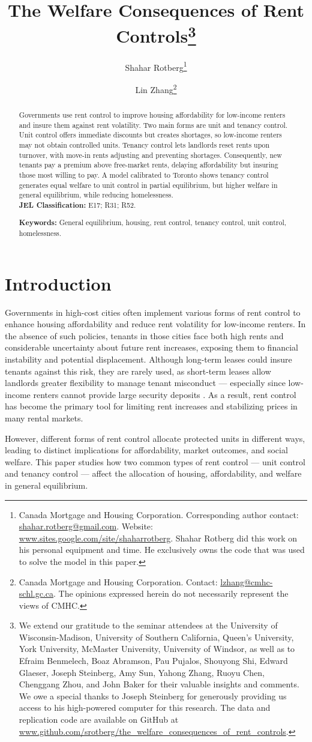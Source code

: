 \documentclass[parskip=full]{article}
\title{\vspace{-1.8cm}The Welfare Consequences of Rent Controls\footnote{We extend our gratitude to the seminar attendees at the University of Wisconsin-Madison, University of Southern California, Queen's University, York University, McMaster University, University of Windsor, as well as to Efraim Benmelech, Boaz Abramson, Pau Pujalos, Shouyong Shi, Edward Glaeser, Joseph Steinberg, Amy Sun, Yahong Zhang, Ruoyu Chen, Chenggang Zhou, and John Baker for their valuable insights and comments. We owe a special thanks to Joseph Steinberg for generously providing us access to his high-powered computer for this research. The data and replication code are available on GitHub at \url{www.github.com/srotberg/the_welfare_consequences_of_rent_controls}.}}
\author{Shahar Rotberg\footnote{Canada Mortgage and Housing Corporation. Corresponding author contact: \url{shahar.rotberg@gmail.com}. Website: \url{www.sites.google.com/site/shaharrotberg}. Shahar Rotberg did this work on his personal equipment and time. He exclusively owns the code that was used to solve the model in this paper.} \and Lin Zhang\footnote{Canada Mortgage and Housing Corporation. Contact: \url{lzhang@cmhc-schl.gc.ca}. The opinions expressed herein do not necessarily represent the views of CMHC.}}
\begin{document}
\maketitle

\begin{abstract}
\onehalfspacing
\noindent Governments use rent control to improve housing affordability for low-income renters and insure them against rent volatility. Two main forms are unit and tenancy control. Unit control offers immediate discounts but creates shortages, so low-income renters may not obtain controlled units. Tenancy control lets landlords reset rents upon turnover, with move-in rents adjusting and preventing shortages. Consequently, new tenants pay a premium above free-market rents, delaying affordability but insuring those most willing to pay. A model calibrated to Toronto shows tenancy control generates equal welfare to unit control in partial equilibrium, but higher welfare in general equilibrium, while reducing homelessness. 
\\[1.5ex]

\noindent \textbf{JEL Classification:} E17; R31; R52. 

\noindent \textbf{Keywords:} General equilibrium, housing, rent control, tenancy control, unit control, homelessness.
\end{abstract}

\section{Introduction}

Governments in high-cost cities often implement various forms of rent control to enhance housing affordability and reduce rent volatility for low-income renters. In the absence of such policies, tenants in those cities face both high rents and considerable uncertainty about future rent increases, exposing them to financial instability and potential displacement. Although long-term leases could insure tenants against this risk, they are rarely used, as short-term leases allow landlords greater flexibility to manage tenant misconduct — especially since low-income renters cannot provide large security deposits \citep[pp. 26–27]{Merrill-2020}. As a result, rent control has become the primary tool for limiting rent increases and stabilizing prices in many rental markets. 

However, different forms of rent control allocate protected units in different ways, leading to distinct implications for affordability, market outcomes, and social welfare. This paper studies how two common types of rent control — unit control and tenancy control — affect the allocation of housing, affordability, and welfare in general equilibrium.
\end{document}
